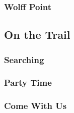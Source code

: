 \subsubsection{Wolff Point}


\subsection{On the Trail}


\subsubsection{Searching}


\subsubsection{Party Time}


\subsubsection{Come With Us}

